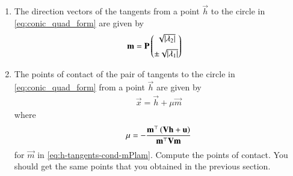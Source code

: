 \begin{enumerate}[label=\thesection.\arabic*.,ref=\thesection.\theenumi]
\item
	The direction vectors of the tangents from a point 
$\vec{h}$ to the circle in \eqref{eq:conic_quad_form} are given by  
\begin{align}
  \vec{m}&= \vec{P}\myvec{\sqrt{\abs{\lambda_2}} \\[2mm]  \pm \sqrt{\abs{\lambda_1}}}
	  \label{eq:h-tangents-cond-mPlam}
\end{align}
\item The points of contact of the pair 
of tangents 
to the circle in \eqref{eq:conic_quad_form} 
	from 
	a point $\vec{h}$ 
	are given by 
  \begin{align}
  \label{eq:line_dir_pt-lam}
	  \vec{x}  = \vec{h} + \mu \vec{m}
  \end{align}
  where 
  \begin{align}
  \label{eq:line_dir_pt-lam-mu}
	  \mu = -\frac{\vec{m}^{\top}\brak{\vec{V}\vec{h}+\vec{u}}}{\vec{m}^{\top}\vec{V}\vec{m} }
  \end{align}
	for $\vec{m}$ in 
	  \eqref{eq:h-tangents-cond-mPlam}.
  Compute the points of contact. You should get the same points that you obtained in the previous section. 
\end{enumerate}
